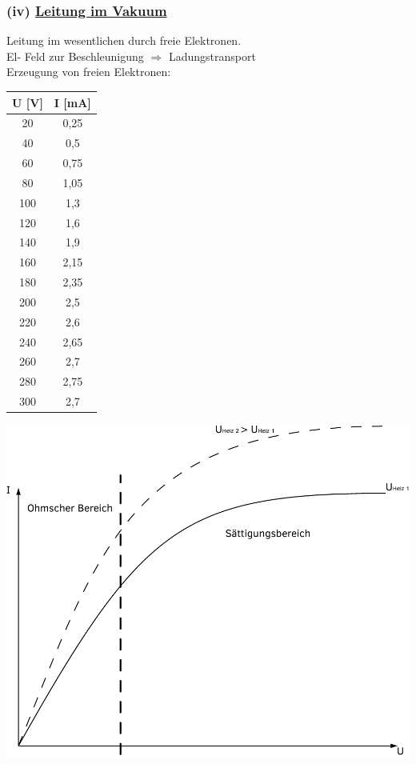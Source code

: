 \documentclass[11pt]{article}
\begin{document}
	\subsubsection*{(iv) \underline{Leitung im Vakuum}} \hfill \break
	Leitung im wesentlichen durch freie Elektronen.\\
	El- Feld zur Beschleunigung $ \Rightarrow $ Ladungstransport\\
	\break
	Erzeugung von freien Elektronen: \\
	\begin{center}
		\begin{tabular}{ c | c  }
			U [V] & I [mA] \\ \hline
			20 & 0,25 \\
			40 & 0,5 \\
			60 & 0,75 \\
			80 & 1,05 \\
			100 & 1,3 \\
			120 & 1,6 \\
			140 & 1,9 \\
			160 & 2,15 \\
			180 & 2,35 \\
			200 & 2,5 \\
			220 & 2,6 \\
			240 & 2,65 \\
			260 & 2,7 \\
			280 & 2,75 \\
			300 & 2,7 \\
		\end{tabular}
	\end{center}
	
	\begin{center}
		\includegraphics[width=0.8\linewidth]{skizzen/15/VL07/VL7_1.png}
	\end{center}
\end{document}
